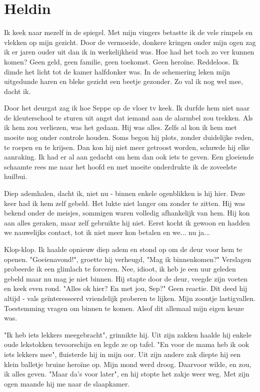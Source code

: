 \documentclass[12pt, justified, a4paper, symmetric]{tufte-book}
\begin{document}
\newpage
\section{Heldin}
Ik keek naar mezelf in de spiegel. Met mijn vingers betastte ik de vele rimpels en vlekken op mijn gezicht. Door de vermoeide, donkere kringen onder mijn ogen zag ik er jaren ouder uit dan ik in werkelijkheid was. Hoe had het toch zo ver kunnen komen? Geen geld, geen familie, geen toekomst. Geen hero\"ine. Reddeloos. Ik dimde het licht tot de kamer halfdonker was. In de schemering leken mijn uitgedunde haren en bleke gezicht een beetje gezonder. Zo val ik nog wel mee, dacht ik.

Door het deurgat zag ik hoe Seppe op de vloer tv keek. Ik durfde hem niet naar de kleuterschool te sturen uit angst dat iemand aan de alarmbel zou trekken. Als ik hem zou verliezen, was het gedaan. Hij was alles. Zelfs al kon ik hem met moeite nog onder controle houden. Soms begon hij plots, zonder duidelijke reden, te roepen en te krijsen. Dan kon hij niet meer getroost worden, schuwde hij elke aanraking. Ik had er al aan gedacht om hem dan ook iets te geven. Een gloeiende schaamte rees me naar het hoofd en met moeite onderdrukte ik de zoveelste huilbui.

Diep ademhalen, dacht ik, niet nu - binnen enkele ogenblikken is hij hier. Deze keer had ik hem zelf gebeld. Het lukte niet langer om zonder te zitten. Hij was bekend onder de meisjes, sommigen waren volledig afhankelijk van hem. Hij kon aan alles geraken, maar zelf gebruikte hij niet. Eerst kocht ik gewoon en hadden we nauwelijks contact, tot ik niet meer kon betalen en we... nu ja...

Klop-klop. Ik haalde opnieuw diep adem en stond op om de deur voor hem te openen.
"Goeienavond!", groette hij verheugd, "Mag ik binnenkomen?" Verslagen probeerde ik een glimlach te forceren. Nee, idioot, ik heb je een uur geleden gebeld maar nu mag je niet binnen. Hij stapte door de deur, veegde zijn voeten en keek even rond. "Alles ok hier? En met jou, Sep?" Geen reactie. Dit deed hij altijd - vals ge\"interesseerd vriendelijk proberen te lijken. Mijn zoontje lastigvallen. Toestemming vragen om binnen te komen. Alsof dit allemaal mijn eigen keuze was.

"Ik heb iets lekkers meegebracht", grinnikte hij. Uit zijn zakken haalde hij enkele oude lekstokken tevoorschijn en legde ze op tafel. "En voor de mama heb ik ook iets lekkers mee", fluisterde hij in mijn oor. Uit zijn andere zak diepte hij een klein balletje bruine hero\"ine op. Mijn mond werd droog. Daarvoor wilde, en zou, ik alles geven. "Maar da's voor later", en hij stopte het zakje weer weg. Met zijn ogen maande hij me naar de slaapkamer.
\end{document}
